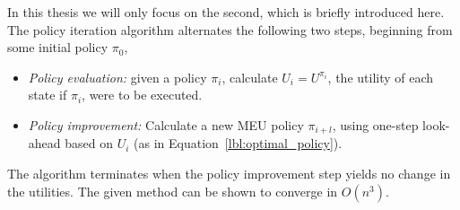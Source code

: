 In this thesis we will only focus on the second, which is briefly introduced here. \\
The policy iteration algorithm alternates the following two steps, beginning from some initial policy $\pi_0$,
\begin{itemize}
    \item \emph{Policy evaluation:} given a policy $\pi_i$, calculate $U_i = U^{\pi_i}$, the utility of each state if $\pi_i$, were to be executed.
    \item \emph{Policy improvement:} Calculate a new MEU policy $\pi_{i+l}$, using one-step look-ahead based on $U_i$ (as in Equation~\ref{lbl:optimal_policy}).
\end{itemize}
The algorithm terminates when the policy improvement step yields no change in the utilities. The given method can be shown to converge in $O(n^3)$.




